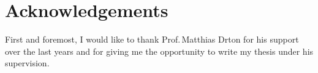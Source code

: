 \section*{Acknowledgements}

First and foremost, I would like to thank Prof.\,Matthias Drton for his support over the last years and for giving me the opportunity to write my thesis under his supervision.
